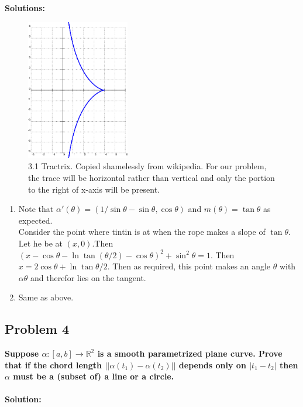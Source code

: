 \documentclass[oneside]{book}\twocolumn
\begin{document}
\textbf{Solutions:}
\begin{figure}
    \centering
    \includegraphics[width=0.4\textwidth]{Tractrix.png}
    \caption{3.1 Tractrix. Copied shamelessly from wikipedia. For our problem, the trace will be horizontal rather than vertical and only the portion to the right of x-axis will be present.}
    \label{fig:my_label}
\end{figure}
\begin{enumerate}[start=2]
    \item Note that $\alpha'(\theta)=(1/\sin\theta-\sin\theta,\cos\theta)$ and $m(\theta)=\tan\theta$ as expected.\\
    Consider the point where tintin is at when the rope makes a slope of $\tan\theta$. Let he be at $(x,0)$.Then $(x-\cos\theta-\ln\tan(\theta/2)-\cos\theta)^2+\sin^2\theta=1$. Then $x=2\cos\theta+\ln\tan\theta/2$. Then as required, this point makes an angle $\theta$ with $\alpha\theta$ and therefor lies on the tangent.
    \item Same as above.
\end{enumerate}

\subsection{Problem 4}\textbf{Suppose $\alpha:[a,b]\to\mathbb R^2$ is a smooth parametrized plane curve. Prove that if the chord length
$||\alpha(t_1)-\alpha(t_2)||$ depends only on $|t_1-t_2|$ then $\alpha$ must be a (subset of) a line or a circle.\\\\
Solution:}\\
\end{document}
